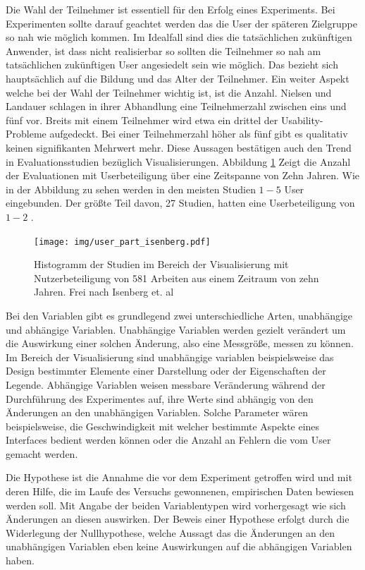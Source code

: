 \documentclass[draft=false
              ,paper=a4
              ,twoside=false
              ,fontsize=11pt
              ,headsepline
              ,BCOR10mm
              ,DIV11
              ]{scrbook}
\begin{document}
Die Wahl der Teilnehmer ist essentiell für den Erfolg eines Experiments. Bei Experimenten sollte darauf geachtet werden das die User der späteren Zielgruppe so nah wie möglich kommen. Im Idealfall sind dies die tatsächlichen zukünftigen Anwender, ist dass nicht realisierbar so sollten die Teilnehmer so nah am tatsächlichen zukünftigen User angesiedelt sein wie möglich. Das bezieht sich hauptsächlich auf die Bildung und das Alter der Teilnehmer. Ein weiter Aspekt welche bei der Wahl der Teilnehmer wichtig ist, ist die Anzahl. Nielsen und Landauer \cite{nielsen_mathematical_1993} schlagen in ihrer Abhandlung eine Teilnehmerzahl zwischen eins und fünf vor. Breits mit einem Teilnehmer wird etwa ein drittel der Usability-Probleme aufgedeckt. Bei einer Teilnehmerzahl höher als fünf gibt es qualitativ keinen signifikanten Mehrwert mehr. Diese Aussagen bestätigen auch den Trend in Evaluationsstudien bezüglich Visualisierungen. Abbildung \ref{fig:no_of_users} Zeigt die Anzahl der Evaluationen mit Userbeteiligung über eine Zeitspanne von Zehn Jahren. Wie in der Abbildung zu sehen werden in den meisten Studien $1 - 5$ User eingebunden. Der größte Teil davon, 27 Studien, hatten eine Userbeteiligung von $1 - 2$ \cite{isenberg_systematic_2013}. 

\begin{figure}[htbp]
  \centering
  \texttt{[image: img/user\_part\_isenberg.pdf]}
  \caption{Histogramm der Studien im Bereich der Visualisierung mit Nutzerbeteiligung von 581 Arbeiten aus einem Zeitraum von zehn Jahren. Frei nach Isenberg et. al \cite{isenberg_systematic_2013}}
  \label{fig:no_of_users}
\end{figure}

Bei den Variablen gibt es grundlegend zwei unterschiedliche Arten, unabhängige und abhängige Variablen. Unabhängige Variablen werden gezielt verändert um die Auswirkung einer solchen Änderung, also eine Messgröße, messen zu können. Im Bereich der Visualisierung sind unabhängige variablen beispielsweise das Design bestimmter Elemente einer Darstellung oder der Eigenschaften der Legende. Abhängige Variablen weisen messbare Veränderung während der Durchführung des Experimentes auf, ihre Werte sind abhängig von den Änderungen an den unabhängigen Variablen. Solche Parameter wären beispielsweise, die Geschwindigkeit mit welcher bestimmte Aspekte eines Interfaces bedient werden können oder die Anzahl an Fehlern die vom User gemacht werden.

Die Hypothese ist die Annahme die vor dem Experiment getroffen wird und mit deren Hilfe, die im Laufe des Versuchs gewonnenen, empirischen Daten bewiesen werden soll. Mit Angabe der beiden Variablentypen wird vorhergesagt wie sich Änderungen an diesen auswirken. Der Beweis einer Hypothese erfolgt durch die Widerlegung der Nullhypothese, welche Aussagt das die Änderungen an den unabhängigen Variablen eben keine Auswirkungen auf die abhängigen Variablen haben. 
\end{document}
